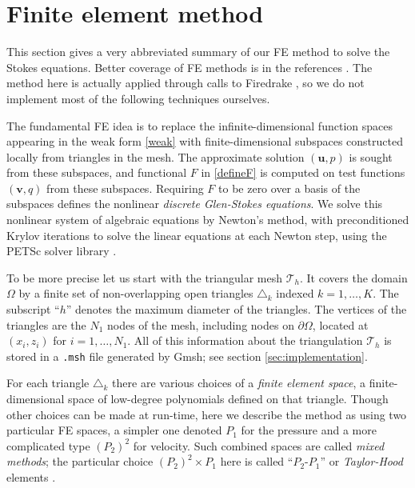\documentclass[letterpaper,final,12pt,reqno]{amsart}
\newcommand{\bu}{\mathbf{u}}
\newcommand{\bv}{\mathbf{v}}
\begin{document}
\section{Finite element method} \label{sec:femethod}

This section gives a very abbreviated summary of our FE method to solve the Stokes equations.  Better coverage of FE methods is in the references \cite{Braess2007,BuelerBook,Elmanetal2014}.  The method here is actually applied through calls to Firedrake \cite{Rathgeberetal2016}, so we do not implement most of the following techniques ourselves.

The fundamental FE idea is to replace the infinite-dimensional function spaces appearing in the weak form \eqref{weak} with finite-dimensional subspaces constructed locally from triangles in the mesh.  The approximate solution $(\bu,p)$ is sought from these subspaces, and functional $F$ in \eqref{defineF} is computed on test functions $(\bv,q)$ from these subspaces.  Requiring $F$ to be zero over a basis of the subspaces defines the nonlinear \emph{discrete Glen-Stokes equations}.  We solve this nonlinear system of algebraic equations by Newton's method, with preconditioned Krylov iterations to solve the linear equations at each Newton step, using the PETSc solver library \cite{Balayetal2018,BuelerBook}.

To be more precise let us start with the triangular mesh $\mathcal{T}_h$.  It covers the domain $\Omega$ by a finite set of non-overlapping open triangles $\triangle_k$ indexed $k=1,\dots,K$.  The subscript ``$h$'' denotes the maximum diameter of the triangles.  The vertices of the triangles are the $N_1$ nodes of the mesh, including nodes on $\partial\Omega$, located at $(x_i,z_i)$ for $i=1,\dots,N_1$.  All of this information about the triangulation $\mathcal{T}_h$ is stored in a \texttt{.msh} file generated by Gmsh; see section \ref{sec:implementation}.

For each triangle $\triangle_k$ there are various choices of a \emph{finite element space}, a finite-dimensional space of low-degree polynomials defined on that triangle.  Though other choices can be made at run-time, here we describe the method as using two particular FE spaces, a simpler one denoted $P_1$ for the pressure and a more complicated type $(P_2)^2$ for velocity.  Such combined spaces are called \emph{mixed methods}; the particular choice $(P_2)^2 \times P_1$ here is called ``$P_2$-$P_1$'' or \emph{Taylor-Hood} elements \cite{Elmanetal2014}.
\end{document}
